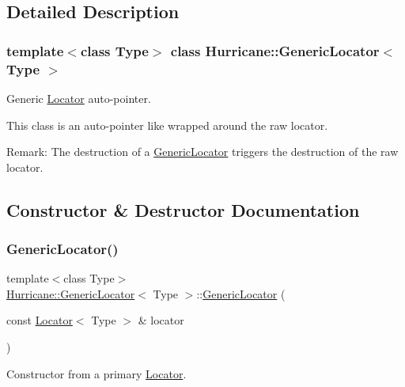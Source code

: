 \subsection{Detailed Description}
\subsubsection*{template$<$class Type$>$\newline
class Hurricane\+::\+Generic\+Locator$<$ Type $>$}

Generic \hyperlink{classHurricane_1_1Locator}{Locator} auto-\/pointer. 

This class is an auto-\/pointer like wrapped around the raw locator.

\begin{DoxyParagraph}{Remark\+:}
The destruction of a \hyperlink{classHurricane_1_1GenericLocator}{Generic\+Locator} triggers the destruction of the raw locator. 
\end{DoxyParagraph}


\subsection{Constructor \& Destructor Documentation}
\mbox{\label{classHurricane_1_1GenericLocator_a878eae335b3f60fc66ec6362d84c2b3e}} 
\subsubsection{\texorpdfstring{Generic\+Locator()}{GenericLocator()}\hspace{0.1cm}{\footnotesize\ttfamily [1/3]}}
{\footnotesize\ttfamily template$<$class Type$>$ \\
\hyperlink{classHurricane_1_1GenericLocator}{Hurricane\+::\+Generic\+Locator}$<$ Type $>$\+::\hyperlink{classHurricane_1_1GenericLocator}{Generic\+Locator} (\begin{DoxyParamCaption}\item[{const \hyperlink{classHurricane_1_1Locator}{Locator}$<$ Type $>$ \&}]{locator }\end{DoxyParamCaption})\hspace{0.3cm}{\ttfamily [inline]}}

Constructor from a primary \hyperlink{classHurricane_1_1Locator}{Locator}.

